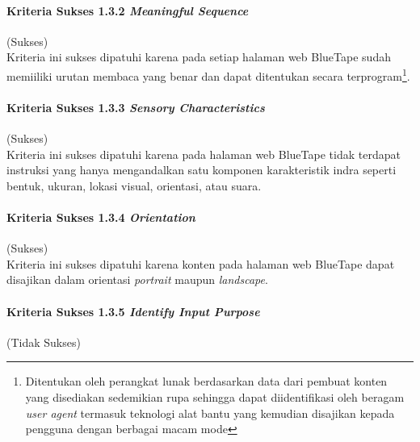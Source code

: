 \paragraph{Kriteria Sukses 1.3.2 \textit{Meaningful Sequence}}
\label{par:kepatuhan_bluetape_kriteria_sukses_1.3.2}
(Sukses)\\

Kriteria ini sukses dipatuhi karena pada setiap halaman web BlueTape sudah memiiliki urutan membaca yang benar dan dapat ditentukan secara terprogram\footnote{Ditentukan oleh perangkat lunak berdasarkan data dari pembuat konten yang disediakan sedemikian rupa sehingga dapat diidentifikasi oleh beragam \textit{user agent} termasuk teknologi alat bantu yang kemudian disajikan kepada pengguna dengan berbagai macam mode}. 

\paragraph{Kriteria Sukses 1.3.3 \textit{Sensory Characteristics}}
\label{par:kepatuhan_bluetape_kriteria_sukses_1.3.3}
(Sukses)\\

Kriteria ini sukses dipatuhi karena pada halaman web BlueTape tidak terdapat instruksi yang hanya mengandalkan satu komponen karakteristik indra seperti bentuk, ukuran, lokasi visual, orientasi, atau suara.

\paragraph{Kriteria Sukses 1.3.4 \textit{Orientation}}
\label{par:kepatuhan_bluetape_kriteria_sukses_1.3.4}
(Sukses)\\

Kriteria ini sukses dipatuhi karena konten pada halaman web BlueTape dapat disajikan dalam orientasi \textit{portrait} maupun \textit{landscape}.

\paragraph{Kriteria Sukses 1.3.5 \textit{Identify Input Purpose}}
\label{par:kepatuhan_bluetape_kriteria_sukses_1.3.5}
(Tidak Sukses)\\

